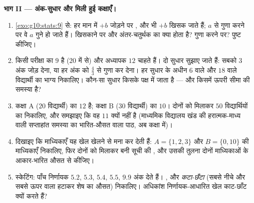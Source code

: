 \begin{problem}[{सप्ताहांत समस्या --- माध्य बनाम माध्यिका: बहिर्मान,
अंक-सुधार, सड़क किनारे का गोदाम, और वह कॉकपिट जो किसी के लिए नहीं बना}]
\medskip
\noindent\textbf{भाग II --- अंक-सुधार और मिली हुई कक्षाएँ।}
\begin{enumerate}[resume]
  \item \cref{exo:g10:stats:9} से: हर मान में $+b$ जोड़ने पर ,  और  भी
        $+b$ खिसक जाते हैं; $a$ से गुणा करने पर वे $a$ गुने हो जाते
        हैं। खिसकाने पर  और अंतर-चतुर्थक  का क्या होता है? गुणा
        करने पर? पुष्ट कीजिए।
  \item किसी परीक्षा का  $9$ है ($20$ में से) और अध्यापक $12$
         चाहते हैं। दो सुधार सुझाए जाते हैं: सबको $3$ अंक जोड़ देना,
        या हर अंक को $\frac43$ से गुणा कर देना। हर सुधार के अधीन $6$ वाले और
        $18$ वाले विद्यार्थी का भाग्य निकालिए। कौन-सा सुधार किसके पक्ष में
        जाता है --- और किसमें ऊपरी सीमा की समस्या है?
  \item कक्षा A ($20$ विद्यार्थी) का  $12$ है; कक्षा B ($30$
        विद्यार्थी) का  $10$। दोनों को मिलाकर $50$ विद्यार्थियों का
         निकालिए, और समझाइए कि वह $11$ क्यों नहीं है (माध्यमिक
        विद्यालय खंड की हरात्मक-माध्य वाली सप्ताहांत समस्या का भारित-औसत
        वाला पाठ, अब कक्षा में)।
  \item दिखाइए कि माध्यिकाएँ यह खेल खेलने से मना कर देती हैं: $A = \{1, 2, 3\}$ और $B = \{0, 10\}$
        की माध्यिकाएँ निकालिए, फिर दोनों को मिलाकर बनी सूची की , और
        उसकी तुलना दोनों माध्यिकाओं के आकार-भारित औसत से कीजिए।
  \item स्केटिंग: पाँच निर्णायक $5.2$, $5.3$, $5.4$, $5.5$, $9.9$ अंक देते
        हैं। ,  और \emph{कटा-छँटा } (सबसे नीचे और सबसे
        ऊपर वाला हटाकर शेष का औसत) निकालिए। अधिकांश निर्णायक-आधारित खेल
        काट-छाँट क्यों करते हैं?
\end{enumerate}


\end{problem}
